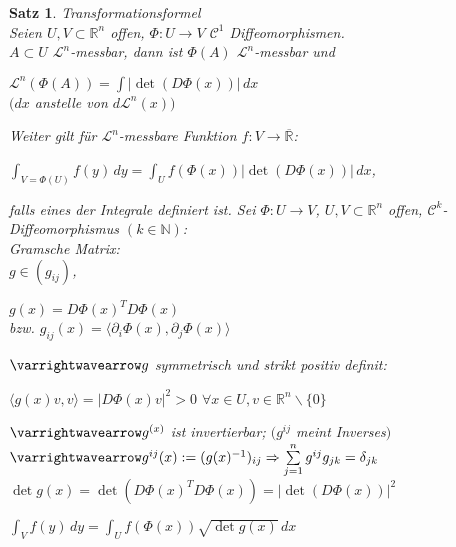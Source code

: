 \documentclass[11pt]{memoir}
\theoremstyle{changebreak}
\newtheorem{Satz}{Satz}[chapter]
\begin{document}
\begin{Satz}
\emph{Transformationsformel} \\
Seien $U, V \subset \mathbb R^n$ offen, $\Phi: U \rightarrow V$ $\mathscr C^1$ Diffeomorphismen. \\
$A \subset U $ $\mathscr L^n$-messbar, dann ist $\Phi(A) $ $\mathscr L^n$-messbar und \\
\begin{center}
	$\mathscr L^n(\Phi(A)) = \int |\det (D\Phi(x))| \, dx$\\
	$(dx$ anstelle von $d\mathscr L^n(x))$
\end{center}
Weiter gilt für $\mathscr L^n$-messbare Funktion $f: V \rightarrow \overline{\mathbb R}$:
\begin{center}
	$\int_{V = \Phi(U)} f(y) \, dy = \int_U f(\Phi(x))|\det (D\Phi(x))|\, dx$,
\end{center}
falls eines der Integrale definiert ist.
Sei $\Phi: U \rightarrow V$, $U, V \subset \mathbb R^n$ offen, $\mathscr C^k$-Diffeomorphismus $(k \in \mathbb N)$: \\


\emph{Gramsche Matrix}: \\
$g \in (g_{ij})$,
\begin{center}
	$g(x) = D\Phi(x)^T D \Phi(x)$ \\
	bzw. $g_{ij}(x) = \langle \partial_i \Phi(x), \partial_j \Phi(x) \rangle$
\end{center}
$\varrightwavearrow g$ symmetrisch und strikt positiv definit:
\begin{center}
	$\langle g(x)v, v\rangle = |D\Phi(x)v|^2 > 0$ $\forall x \in U, v \in \mathbb R^n\backslash \{0\}$
\end{center}
$\varrightwavearrow g^{(x)}$ ist invertierbar;
$(g^{ij}$ meint Inverses$)$ \\
$\varrightwavearrow g^{ij}(x) := (g(x)^{-1})_{ij} \Rightarrow \sum\limits_{j=1}^n g^{ij} g_{jk} = \delta_{jk}$ \\
$\det g(x) = \det(D\Phi(x)^T D \Phi(x)) = |\det(D \Phi(x))|^2$

\begin{center}
	$\int_V f(y) \, dy = \int_U f(\Phi(x)) \sqrt{\det g(x)} \, dx$
\end{center}

\end{Satz}
\end{document}
